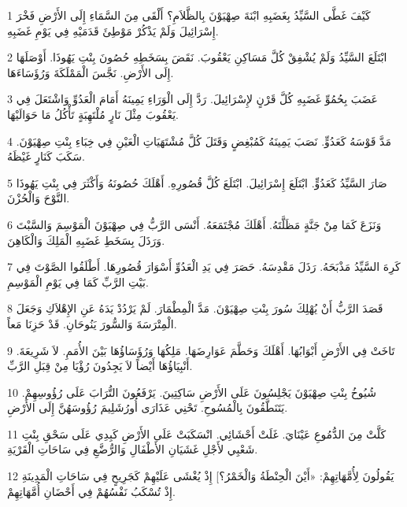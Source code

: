 \par 1 كَيْفَ غَطَّى السَّيِّدُ بِغَضَبِهِ ابْنَةَ صِهْيَوْنَ بِالظَّلاَمِ؟ أَلْقَى مِنَ السَّمَاءِ إِلَى الأَرْضِ فَخْرَ إِسْرَائِيلَ وَلَمْ يَذْكُرْ مَوْطِئَ قَدَمَيْهِ فِي يَوْمِ غَضَبِهِ.
\par 2 ابْتَلَعَ السَّيِّدُ وَلَمْ يُشْفِقْ كُلَّ مَسَاكِنِ يَعْقُوبَ. نَقَضَ بِسَخَطِهِ حُصُونَ بِنْتِ يَهُوذَا. أَوْصَلَهَا إِلَى الأَرْضِ. نَجَّسَ الْمَمْلَكَةَ وَرُؤَسَاءَهَا.
\par 3 عَضَبَ بِحُمُوِّ غَضَبِهِ كُلَّ قَرْنٍ لإِسْرَائِيلَ. رَدَّ إِلَى الْوَرَاءِ يَمِينَهُ أَمَامَ الْعَدُوِّ وَاشْتَعَلَ فِي يَعْقُوبَ مِثْلَ نَارٍ مُلْتَهِبَةٍ تَأْكُلُ مَا حَوَالَيْهَا.
\par 4 مَدَّ قَوْسَهُ كَعَدُوٍّ. نَصَبَ يَمِينَهُ كَمُبْغِضٍ وَقَتَلَ كُلَّ مُشْتَهَيَاتِ الْعَيْنِ فِي خِبَاءِ بِنْتِ صِهْيَوْنَ. سَكَبَ كَنَارٍ غَيْظَهُ.
\par 5 صَارَ السَّيِّدُ كَعَدُوٍّ. ابْتَلَعَ إِسْرَائِيلَ. ابْتَلَعَ كُلَّ قُصُورِهِ. أَهْلَكَ حُصُونَهُ وَأَكْثَرَ فِي بِنْتِ يَهُوذَا النَّوْحَ وَالْحُزْنَ.
\par 6 وَنَزَعَ كَمَا مِنْ جَنَّةٍ مَظَلَّتَهُ. أَهْلَكَ مُجْتَمَعَهُ. أَنْسَى الرَّبُّ فِي صِهْيَوْنَ الْمَوْسِمَ وَالسَّبْتَ وَرَذَلَ بِسَخَطِ غَضَبِهِ الْمَلِكَ وَالْكَاهِنَ.
\par 7 كَرِهَ السَّيِّدُ مَذْبَحَهُ. رَذَلَ مَقْدِسَهُ. حَصَرَ فِي يَدِ الْعَدُوِّ أَسْوَارَ قُصُورِهَا. أَطْلَقُوا الصَّوْتَ فِي بَيْتِ الرَّبِّ كَمَا فِي يَوْمِ الْمَوْسِمِ.
\par 8 قَصَدَ الرَّبُّ أَنْ يُهْلِكَ سُورَ بِنْتِ صِهْيَوْنَ. مَدَّ الْمِطْمَارَ. لَمْ يَرْدُدْ يَدَهُ عَنِ الإِهْلاَكِ وَجَعَلَ الْمِتْرَسَةَ وَالسُّورَ يَنُوحَانِ. قَدْ حَزِنَا مَعاً.
\par 9 تَاخَتْ فِي الأَرْضِ أَبْوَابُهَا. أَهْلَكَ وَحَطَّمَ عَوَارِضَهَا. مَلِكُهَا وَرُؤَسَاؤُهَا بَيْنَ الأُمَمِ. لاَ شَرِيعَةَ. أَنْبِيَاؤُهَا أَيْضاً لاَ يَجِدُونَ رُؤْيَا مِنْ قِبَلِ الرَّبِّ.
\par 10 شُيُوخُ بِنْتِ صِهْيَوْنَ يَجْلِسُونَ عَلَى الأَرْضِ سَاكِتِينَ. يَرْفَعُونَ التُّرَابَ عَلَى رُؤُوسِهِمْ. يَتَنَطَّقُونَ بِالْمُسُوحِ. تَحْنِي عَذَارَى أُورُشَلِيمَ رُؤُوسَهُنَّ إِلَى الأَرْضِ.
\par 11 كَلَّتْ مِنَ الدُّمُوعِ عَيْنَايَ. غَلَتْ أَحْشَائِي. انْسَكَبَتْ عَلَى الأَرْضِ كَبِدِي عَلَى سَحْقِ بِنْتِ شَعْبِي لأَجْلِ غَشَيَانِ الأَطْفَالِ وَالرُّضَّعِ فِي سَاحَاتِ الْقَرْيَةِ.
\par 12 يَقُولُونَ لِأُمَّهَاتِهِمْ: «أَيْنَ الْحِنْطَةُ وَالْخَمْرُ؟] إِذْ يُغْشَى عَلَيْهِمْ كَجَرِيحٍ فِي سَاحَاتِ الْمَدِينَةِ إِذْ تُسْكَبُ نَفْسُهُمْ فِي أَحْضَانِ أُمَّهَاتِهِمْ.
